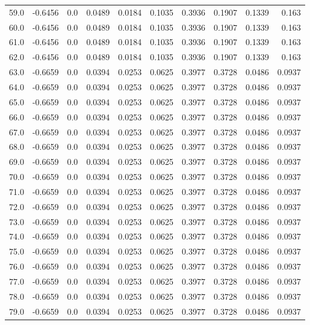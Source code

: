 \begin{longtable}{lrrrrrrrrr}
59.0 & -0.6456 & 0.0 & 0.0489 & 0.0184 & 0.1035 & 0.3936 & 0.1907 & 0.1339 & 0.163 \\
60.0 & -0.6456 & 0.0 & 0.0489 & 0.0184 & 0.1035 & 0.3936 & 0.1907 & 0.1339 & 0.163 \\
61.0 & -0.6456 & 0.0 & 0.0489 & 0.0184 & 0.1035 & 0.3936 & 0.1907 & 0.1339 & 0.163 \\
62.0 & -0.6456 & 0.0 & 0.0489 & 0.0184 & 0.1035 & 0.3936 & 0.1907 & 0.1339 & 0.163 \\
63.0 & -0.6659 & 0.0 & 0.0394 & 0.0253 & 0.0625 & 0.3977 & 0.3728 & 0.0486 & 0.0937 \\
64.0 & -0.6659 & 0.0 & 0.0394 & 0.0253 & 0.0625 & 0.3977 & 0.3728 & 0.0486 & 0.0937 \\
65.0 & -0.6659 & 0.0 & 0.0394 & 0.0253 & 0.0625 & 0.3977 & 0.3728 & 0.0486 & 0.0937 \\
66.0 & -0.6659 & 0.0 & 0.0394 & 0.0253 & 0.0625 & 0.3977 & 0.3728 & 0.0486 & 0.0937 \\
67.0 & -0.6659 & 0.0 & 0.0394 & 0.0253 & 0.0625 & 0.3977 & 0.3728 & 0.0486 & 0.0937 \\
68.0 & -0.6659 & 0.0 & 0.0394 & 0.0253 & 0.0625 & 0.3977 & 0.3728 & 0.0486 & 0.0937 \\
69.0 & -0.6659 & 0.0 & 0.0394 & 0.0253 & 0.0625 & 0.3977 & 0.3728 & 0.0486 & 0.0937 \\
70.0 & -0.6659 & 0.0 & 0.0394 & 0.0253 & 0.0625 & 0.3977 & 0.3728 & 0.0486 & 0.0937 \\
71.0 & -0.6659 & 0.0 & 0.0394 & 0.0253 & 0.0625 & 0.3977 & 0.3728 & 0.0486 & 0.0937 \\
72.0 & -0.6659 & 0.0 & 0.0394 & 0.0253 & 0.0625 & 0.3977 & 0.3728 & 0.0486 & 0.0937 \\
73.0 & -0.6659 & 0.0 & 0.0394 & 0.0253 & 0.0625 & 0.3977 & 0.3728 & 0.0486 & 0.0937 \\
74.0 & -0.6659 & 0.0 & 0.0394 & 0.0253 & 0.0625 & 0.3977 & 0.3728 & 0.0486 & 0.0937 \\
75.0 & -0.6659 & 0.0 & 0.0394 & 0.0253 & 0.0625 & 0.3977 & 0.3728 & 0.0486 & 0.0937 \\
76.0 & -0.6659 & 0.0 & 0.0394 & 0.0253 & 0.0625 & 0.3977 & 0.3728 & 0.0486 & 0.0937 \\
77.0 & -0.6659 & 0.0 & 0.0394 & 0.0253 & 0.0625 & 0.3977 & 0.3728 & 0.0486 & 0.0937 \\
78.0 & -0.6659 & 0.0 & 0.0394 & 0.0253 & 0.0625 & 0.3977 & 0.3728 & 0.0486 & 0.0937 \\
79.0 & -0.6659 & 0.0 & 0.0394 & 0.0253 & 0.0625 & 0.3977 & 0.3728 & 0.0486 & 0.0937 \\

\end{longtable}
